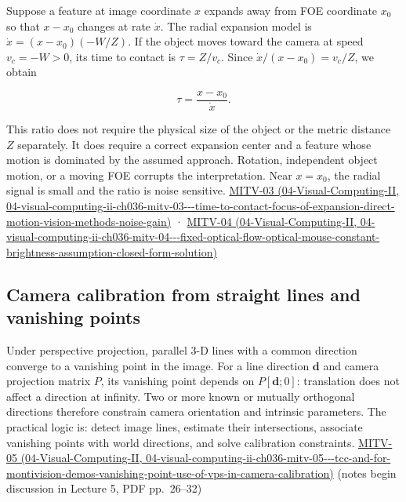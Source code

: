 Suppose a feature at image coordinate \(x\) expands away from FOE coordinate \(x_0\) so that \(x-x_0\) changes at rate \(\dot{x}\). The radial expansion model is \(\dot{x}=(x-x_0)(-W/Z)\). If the object moves toward the camera at speed \(v_c=-W>0\), its time to contact is \(\tau=Z/v_c\). Since \(\dot{x}/(x-x_0)=v_c/Z\), we obtain

\[
\tau=\frac{x-x_0}{\dot{x}}.
\]

This ratio does not require the physical size of the object or the metric distance \(Z\) separately. It does require a correct expansion center and a feature whose motion is dominated by the assumed approach. Rotation, independent object motion, or a moving FOE corrupts the interpretation. Near \(x=x_0\), the radial signal is small and the ratio is noise sensitive. \href{../04-Visual-Computing-II/main.pdf\#nameddest=04-visual-computing-ii-ch036-mitv-03---time-to-contact-focus-of-expansion-direct-motion-vision-methods-noise-gain}{MITV-03 (04-Visual-Computing-II, 04-visual-computing-ii-ch036-mitv-03-\/-\/-time-to-contact-focus-of-expansion-direct-motion-vision-methods-noise-gain)} · \href{../04-Visual-Computing-II/main.pdf\#nameddest=04-visual-computing-ii-ch036-mitv-04---fixed-optical-flow-optical-mouse-constant-brightness-assumption-closed-form-solution}{MITV-04 (04-Visual-Computing-II, 04-visual-computing-ii-ch036-mitv-04-\/-\/-fixed-optical-flow-optical-mouse-constant-brightness-assumption-closed-form-solution)}

\subsection{Camera calibration from straight lines and vanishing points}\label{03-visual-computing-i-ch003-camera-calibration-from-straight-lines-and-vanishing-points}

Under perspective projection, parallel 3-D lines with a common direction converge to a vanishing point in the image. For a line direction \(\mathbf{d}\) and camera projection matrix \(P\), its vanishing point depends on \(P[\mathbf{d};0]\): translation does not affect a direction at infinity. Two or more known or mutually orthogonal directions therefore constrain camera orientation and intrinsic parameters. The practical logic is: detect image lines, estimate their intersections, associate vanishing points with world directions, and solve calibration constraints. \href{../04-Visual-Computing-II/main.pdf\#nameddest=04-visual-computing-ii-ch036-mitv-05---tcc-and-for-montivision-demos-vanishing-point-use-of-vps-in-camera-calibration}{MITV-05 (04-Visual-Computing-II, 04-visual-computing-ii-ch036-mitv-05-\/-\/-tcc-and-for-montivision-demos-vanishing-point-use-of-vps-in-camera-calibration)} (notes begin discussion in Lecture 5, PDF pp.~26--32)

